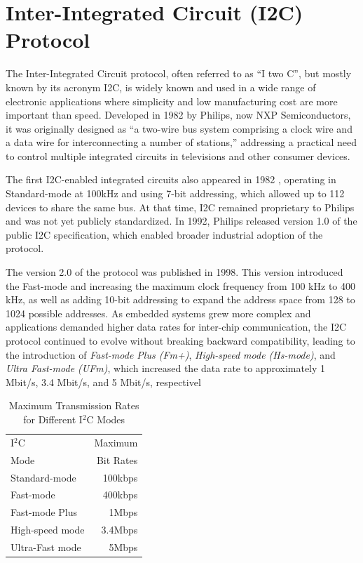 \section{Inter-Integrated Circuit (I2C) Protocol}
\label{chap:Back_I2C}

The Inter-Integrated Circuit protocol, often referred to as “I two C”, but mostly 
known by its acronym I2C, is widely known and used in a wide range of electronic 
applications where simplicity and low manufacturing cost are more important than 
speed. Developed in 1982 by Philips, now NXP Semiconductors, it was originally 
designed as “a two-wire bus system comprising a clock wire and a data wire for 
interconnecting a number of stations,” addressing a practical need to control multiple 
integrated circuits in televisions and other consumer devices.

The first I2C-enabled integrated circuits also appeared in 1982 \cite{I2CSpec2000}, operating in 
Standard-mode at 100kHz and using 7-bit addressing, which allowed up to 112 
devices to share the same bus. At that time, I2C remained proprietary to Philips 
and was not yet publicly standardized. In 1992, Philips released version 1.0 of the 
public I2C specification, which enabled broader industrial adoption of the protocol.

The version 2.0 of the protocol was published in 1998. This version introduced 
the Fast-mode and increasing the maximum clock frequency from 100 kHz to 400 
kHz, as well as adding 10-bit addressing to expand the address space from 128 to 
1024 possible addresses. As embedded systems grew more complex and applications 
demanded higher data rates for inter-chip communication, the I2C protocol continued 
to evolve without breaking backward compatibility, leading to the introduction 
of \textit{Fast-mode Plus (Fm+)}, \textit{High-speed mode (Hs-mode)}, and \textit{Ultra Fast-mode (UFm)}, 
which increased the data rate to approximately 1 Mbit/s, 3.4 Mbit/s, and 5 Mbit/s, 
respectivel

\begin{table}[H]
    \centering
    \begin{tabular}{l r}
        \toprule
        I$^2$C  & Maximum   \\ 
        Mode    & Bit Rates \\        
        \midrule
        Standard-mode   & 100kbps   \\
        Fast-mode       & 400kbps   \\
        Fast-mode Plus  & 1Mbps     \\
        High-speed mode & 3.4Mbps   \\
        Ultra-Fast mode & 5Mbps     \\
        \bottomrule
    \end{tabular}

    \caption
        {
            Maximum Transmission Rates \\ 
            for Different I$^2$C Modes \cite{I2COverview}
        }
    \label{tab:i2c_transition_rate}
\end{table}

